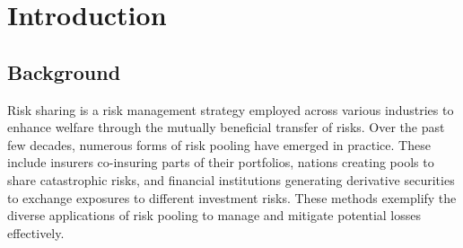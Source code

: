 \documentclass[fleqn,mnsc,nonblindrev]{informs4}
\begin{document}
%

\maketitle

\section{Introduction}
\subsection{Background}

Risk sharing is a risk management strategy employed across various industries to enhance welfare through the mutually beneficial transfer of risks. Over the past few decades, numerous forms of risk pooling have emerged in practice. These include insurers co-insuring parts of their portfolios, nations creating pools to share catastrophic risks, and financial institutions generating derivative securities to exchange exposures to different investment risks. These methods exemplify the diverse applications of risk pooling to manage and mitigate potential losses effectively.
\end{document}
